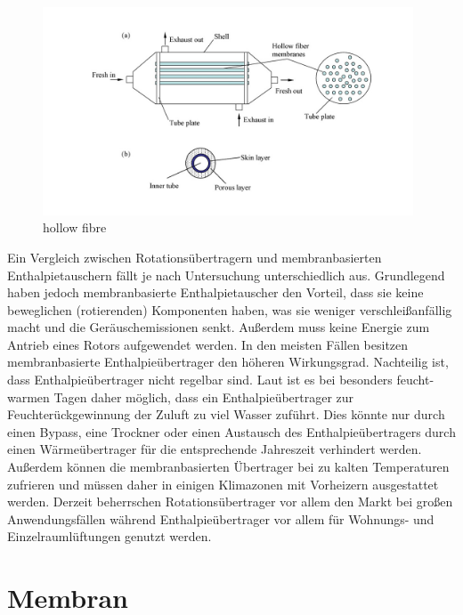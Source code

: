\begin{normalsize}
\begin{LARGE}
\begin{figure} [h]
	\centering
	\includegraphics[width=0.98\textwidth]{pictures/hollow_fibre.jpg}
	\caption{hollow fibre}
	\label{fig:hollow fibre Modul}
\end{figure}

Ein Vergleich zwischen Rotationsübertragern und membranbasierten Enthalpietauschern fällt je nach Untersuchung unterschiedlich aus. Grundlegend haben jedoch membranbasierte Enthalpietauscher den Vorteil, dass sie keine beweglichen (rotierenden) Komponenten haben, was sie weniger verschleißanfällig macht und die Geräuschemissionen senkt. Außerdem muss keine Energie zum Antrieb eines Rotors aufgewendet werden. In den meisten Fällen besitzen membranbasierte Enthalpieübertrager den höheren Wirkungsgrad. %
Nachteilig ist, dass Enthalpieübertrager nicht regelbar sind. Laut %
ist es bei besonders feucht-warmen Tagen daher möglich, dass ein Enthalpieübertrager zur Feuchterückgewinnung der Zuluft zu viel Wasser zuführt. Dies könnte nur durch einen Bypass, eine Trockner oder einen Austausch des Enthalpieübertragers durch einen Wärmeübertrager für die entsprechende Jahreszeit verhindert werden. Außerdem können die membranbasierten Übertrager bei zu kalten Temperaturen zufrieren und müssen daher in einigen Klimazonen mit Vorheizern ausgestattet werden. Derzeit beherrschen Rotationsübertrager vor allem den Markt bei großen Anwendungsfällen während Enthalpieübertrager vor allem für Wohnungs- und Einzelraumlüftungen genutzt werden.  


\section{Membran}


\end{LARGE}
\end{normalsize}
